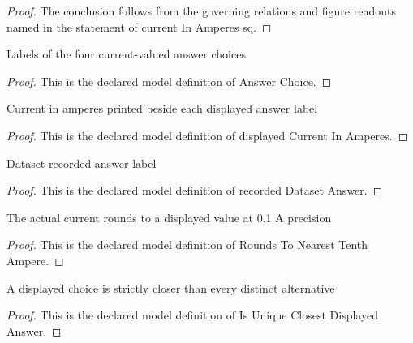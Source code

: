\begin{proof}
  The conclusion follows from the governing relations and figure readouts named in the statement of current In Amperes sq.
\end{proof}
\begin{definition}
  \label{def:physics:phyx-mini-0965:phyxminiproblems-problemphyxmini0965-answerchoice}
  Labels of the four current-valued answer choices
\end{definition}
\begin{proof}
  This is the declared model definition of Answer Choice.
\end{proof}
\begin{definition}
  \label{def:physics:phyx-mini-0965:phyxminiproblems-problemphyxmini0965-answerchoice-displayedcurrentinamperes}
  Current in amperes printed beside each displayed answer label
\end{definition}
\begin{proof}
  This is the declared model definition of displayed Current In Amperes.
\end{proof}
\begin{definition}
  \label{def:physics:phyx-mini-0965:phyxminiproblems-problemphyxmini0965-recordeddatasetanswer}
  Dataset-recorded answer label
\end{definition}
\begin{proof}
  This is the declared model definition of recorded Dataset Answer.
\end{proof}
\begin{definition}
  \label{def:physics:phyx-mini-0965:phyxminiproblems-problemphyxmini0965-roundstonearesttenthampere}
  The actual current rounds to a displayed value at 0.1 A precision
\end{definition}
\begin{proof}
  This is the declared model definition of Rounds To Nearest Tenth Ampere.
\end{proof}
\begin{definition}
  \label{def:physics:phyx-mini-0965:phyxminiproblems-problemphyxmini0965-isuniqueclosestdisplayedanswer}
  A displayed choice is strictly closer than every distinct alternative
\end{definition}
\begin{proof}
  This is the declared model definition of Is Unique Closest Displayed Answer.
\end{proof}
